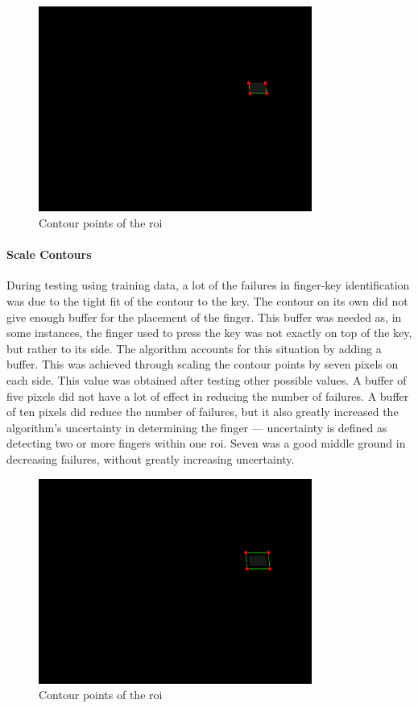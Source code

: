 \documentclass{report}
\begin{document}
\begin{figure}[H]
	\centering
	\includegraphics[width=0.8\textwidth]{key-contour.png}
	\caption{Contour points of the \ac{roi}}
	\centering
\end{figure}

\paragraph{Scale Contours}
During testing using training data, a lot of the failures in finger-key
identification was due to the tight fit of the contour to the key. The contour
on its own did not give enough buffer for the placement of the finger. This
buffer was needed as, in some instances, the finger used to press the key was
not exactly on top of the key, but rather to its side. The algorithm accounts
for this situation by adding a buffer. This was achieved through scaling the
contour points by seven pixels on each side. This value was obtained after
testing other possible values. A buffer of five pixels did not have a lot of
effect in reducing the number of failures. A buffer of ten pixels did reduce the
number of failures, but it also greatly increased the algorithm's uncertainty in
determining the finger --- uncertainty is defined as detecting two or more
fingers within one \ac{roi}. Seven was a good middle ground in decreasing
failures, without greatly increasing uncertainty.

\begin{figure}[H]
	\centering
	\includegraphics[width=0.8\textwidth]{scaled-contour.png}
	\caption{Contour points of the \ac{roi}}
	\centering
\end{figure}
\end{document}
